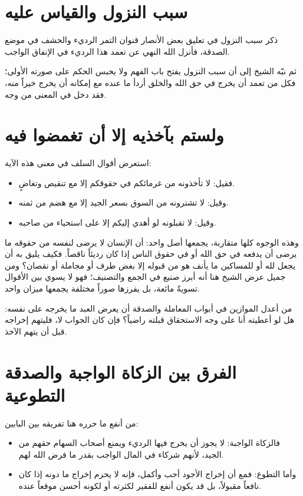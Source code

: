 \section{سبب النزول والقياس عليه}
ذكر  سبب النزول في تعليق بعض الأنصار قنوان التمر الرديء والحشف في موضع الصدقة، فأنزل الله النهي عن تعمد هذا الرديء في الإنفاق الواجب.

ثم نبّه الشيخ إلى أن سبب النزول يفتح باب الفهم ولا يحبس الحكم على صورته الأولى؛ فكل من تعمد أن يخرج في حق الله والخلق أردأ ما عنده مع إمكانه أن يخرج خيراً منه، فقد دخل في المعنى من وجه.

\section{ولستم بآخذيه إلا أن تغمضوا فيه}
استعرض  أقوال السلف في معنى هذه الآية:
\begin{itemize}
    \item فقيل: لا تأخذونه من غرمائكم في حقوقكم إلا مع تنقيص وتغاضٍ.
    \item وقيل: لا تشترونه من السوق بسعر الجيد إلا مع هضم من ثمنه.
    \item وقيل: لا تقبلونه لو أهدي إليكم إلا على استحياء من صاحبه.
\end{itemize}

وهذه الوجوه كلها متقاربة، يجمعها أصل واحد: أن الإنسان لا يرضى لنفسه من حقوقه ما يرضى أن يدفعه في حق الله أو في حقوق الناس إذا كان رديئاً ناقصاً. فكيف يليق به أن يجعل لله أو للمساكين ما يأنف هو من قبوله إلا بغض طرف أو مجاملة أو نقصان؟ ومن جميل عرض الشيخ هنا أنه أبرز صنيع  في الجمع والتصنيف؛ فهو لا يسوي بين الأقوال تسويةً مائعة، بل يفرزها صوراً مختلفة يجمعها ميزان واحد.

\begin{fawaid}
من أعدل الموازين في أبواب المعاملة والصدقة أن يعرض العبد ما يخرجه على نفسه: هل لو أعطيته أنا على وجه الاستحقاق قبلته راضياً؟ فإن كان الجواب لا، فليتهم إخراجه قبل أن يتهم الآخذ.
\end{fawaid}

\section{الفرق بين الزكاة الواجبة والصدقة التطوعية}
من أنفع ما حرره  هنا تفريقه بين البابين:
\begin{itemize}
    \item فالزكاة الواجبة: لا يجوز أن يخرج فيها الرديء ويمنع أصحاب السهام حقهم من الجيد، لأنهم شركاء في المال الواجب بقدر ما فرض الله لهم.
    \item وأما التطوع: فمع أن إخراج الأجود أحب وأكمل، فإنه لا يحرم إخراج ما دونه إذا كان نافعاً مقبولاً، بل قد يكون أنفع للفقير لكثرته أو لكونه أحسن موقعاً عنده.
\end{itemize}

